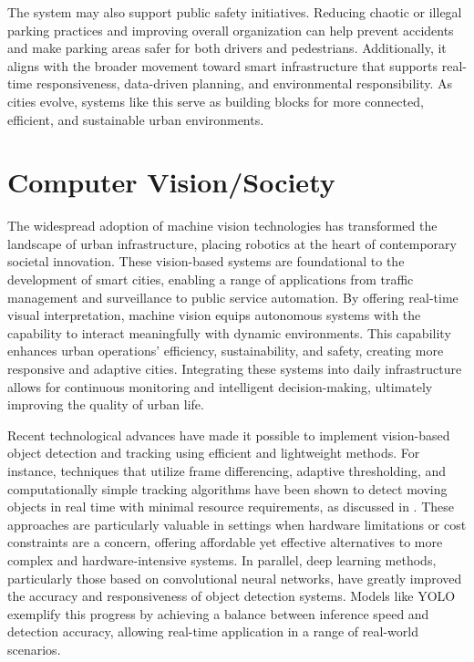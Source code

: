 \documentclass[conference]{IEEEtran}
\begin{document}
The system may also support public safety initiatives. Reducing chaotic or illegal parking practices and improving overall organization can help prevent accidents and make parking areas safer for both drivers and pedestrians. Additionally, it aligns with the broader movement toward smart infrastructure that supports real-time responsiveness, data-driven planning, and environmental responsibility. As cities evolve, systems like this serve as building blocks for more connected, efficient, and sustainable urban environments.


\section{Computer Vision/Society}

The widespread adoption of machine vision technologies has transformed the landscape of urban infrastructure, placing robotics at the heart of contemporary societal innovation. 
These vision-based systems are foundational to the development of smart cities, 
enabling a range of applications from traffic management and surveillance to public service automation. 
By offering real-time visual interpretation, 
machine vision equips autonomous systems with the capability to interact meaningfully with dynamic environments. 
This capability enhances urban operations' efficiency, 
sustainability, 
and safety, 
creating more responsive and adaptive cities. 
Integrating these systems into daily infrastructure allows for continuous monitoring and intelligent decision-making, 
ultimately improving the quality of urban life.

Recent technological advances have made it possible to implement vision-based object detection and tracking using efficient and lightweight methods. 
For instance, 
techniques that utilize frame differencing, 
adaptive thresholding, 
and computationally simple tracking algorithms have been shown to detect moving objects in real time with minimal resource requirements, 
as discussed in \cite{wang_and_zhang}. 
These approaches are particularly valuable in settings when hardware limitations or cost constraints are a concern, 
offering affordable yet effective alternatives to more complex and hardware-intensive systems. 
In parallel, 
deep learning methods, 
particularly those based on convolutional neural networks, 
have greatly improved the accuracy and responsiveness of object detection systems. 
Models like YOLO exemplify this progress by achieving a balance between inference speed and detection accuracy, allowing real-time application in a range of real-world scenarios.
\end{document}
